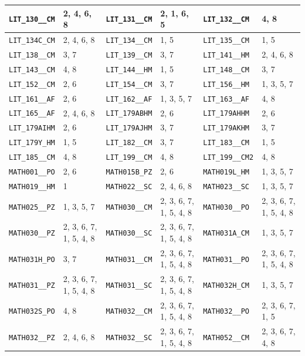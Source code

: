 \begin{longtable}{|l|l||l|l||l|l|}
    \verb|LIT_130__CM| & 2, 4, 6, 8 & \verb|LIT_131__CM| & 2, 1, 6, 5 & \verb|LIT_132__CM| & 4, 8\\\hline
    \verb|LIT_134C_CM| & 2, 4, 6, 8 & \verb|LIT_134__CM| & 1, 5 & \verb|LIT_135__CM| & 1, 5\\\hline
    \verb|LIT_138__CM| & 3, 7 & \verb|LIT_139__CM| & 3, 7 & \verb|LIT_141__HM| & 2, 4, 6, 8\\\hline
    \verb|LIT_143__CM| & 4, 8 & \verb|LIT_144__HM| & 1, 5 & \verb|LIT_148__CM| & 3, 7\\\hline
    \verb|LIT_152__CM| & 2, 6 & \verb|LIT_154__CM| & 3, 7 & \verb|LIT_156__HM| & 1, 3, 5, 7\\\hline
    \verb|LIT_161__AF| & 2, 6 & \verb|LIT_162__AF| & 1, 3, 5, 7 & \verb|LIT_163__AF| & 4, 8\\\hline
    \verb|LIT_165__AF| & 2, 4, 6, 8 & \verb|LIT_179ABHM| & 2, 6 & \verb|LIT_179AHHM| & 2, 6\\\hline
    \verb|LIT_179AIHM| & 2, 6 & \verb|LIT_179AJHM| & 3, 7 & \verb|LIT_179AKHM| & 3, 7\\\hline
    \verb|LIT_179Y_HM| & 1, 5 & \verb|LIT_182__CM| & 3, 7 & \verb|LIT_183__CM| & 1, 5\\\hline
    \verb|LIT_185__CM| & 4, 8 & \verb|LIT_199__CM| & 4, 8 & \verb|LIT_199__CM2| & 4, 8\\\hline
    \verb|MATH001__PO| & 2, 6 & \verb|MATH015B_PZ| & 2, 6 & \verb|MATH019L_HM| & 1, 3, 5, 7\\\hline
    \verb|MATH019__HM| & 1 & \verb|MATH022__SC| & 2, 4, 6, 8 & \verb|MATH023__SC| & 1, 3, 5, 7\\\hline
    \verb|MATH025__PZ| & 1, 3, 5, 7 & \verb|MATH030__CM| & 2, 3, 6, 7, 1, 5, 4, 8 & \verb|MATH030__PO| & 2, 3, 6, 7, 1, 5, 4, 8\\\hline
    \verb|MATH030__PZ| & 2, 3, 6, 7, 1, 5, 4, 8 & \verb|MATH030__SC| & 2, 3, 6, 7, 1, 5, 4, 8 & \verb|MATH031A_CM| & 1, 3, 5, 7\\\hline
    \verb|MATH031H_PO| & 3, 7 & \verb|MATH031__CM| & 2, 3, 6, 7, 1, 5, 4, 8 & \verb|MATH031__PO| & 2, 3, 6, 7, 1, 5, 4, 8\\\hline
    \verb|MATH031__PZ| & 2, 3, 6, 7, 1, 5, 4, 8 & \verb|MATH031__SC| & 2, 3, 6, 7, 1, 5, 4, 8 & \verb|MATH032H_CM| & 1, 3, 5, 7\\\hline
    \verb|MATH032S_PO| & 4, 8 & \verb|MATH032__CM| & 2, 3, 6, 7, 1, 5, 4, 8 & \verb|MATH032__PO| & 2, 3, 6, 7, 1, 5\\\hline
    \verb|MATH032__PZ| & 2, 4, 6, 8 & \verb|MATH032__SC| & 2, 3, 6, 7, 1, 5, 4, 8 & \verb|MATH052__CM| & 2, 3, 6, 7, 4, 8\\\hline

\end{longtable}
